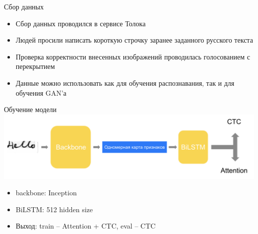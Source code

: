 \documentclass[fleqn, xcolor=x11names]{beamer}
\begin{document}
\begin{frame}{Сбор данных}
    \begin{itemize}
        \item Сбор данных проводился в сервисе Толока
        \item Людей просили написать короткую строчку заранее заданного русского текста
        \item Проверка корректности внесенных изображений проводилась голосованием с перекрытием
        \item Данные можно использовать как для обучения распознавания, так и для обучения GAN'а
    \end{itemize}

    \vspace{10pt}


\end{frame}

\begin{frame}{Обучение модели}
    \centering
    \includegraphics[width=0.8\linewidth]{recognition.png}
    \begin{itemize}
        \item backbone: Inception 
        \item BiLSTM: 512 hidden size
        \item Выход: train -- Attention + CTC, eval -- CTC
    \end{itemize}
\end{frame}
\end{document}
